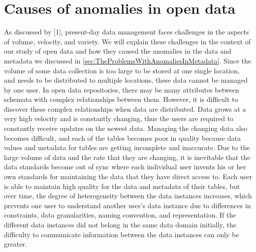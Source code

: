 \section{Causes of anomalies in open data}
\label{sec:CausesOfAnomaliesInOpenData}

As discussed by \cite{10.1145/2845915}[1], present-day data management faces challenges in the aspects of volume, velocity, and variety. We will explain these challenges in the context of our study of open data and how they caused the anomalies in the data and metadata we discussed in \autoref{sec:TheProblemsWithAnomaliesInMetadata}.
Since the volume of some data collection is too large to be stored at one single location, and needs to be distributed to multiple locations, these data cannot be managed by one user. In open data repositories, there may be many attributes between schemata with complex relationships between them. However, it is difficult to discover these complex relationships when data are distributed.
Data grows at a very high velocity and is constantly changing, thus the users are required to constantly receive updates on the newest data. Managing the changing data also becomes difficult, and each of the tables becomes poor in quality because data values and metadata for tables are getting incomplete and inaccurate.
Due to the large volume of data and the rate that they are changing, it is inevitable that the data standards become out of sync where each individual user invents his or her own standards for maintaining the data that they have direct access to. Each user is able to maintain high quality for the data and metadata of their tables, but over time, the degree of heterogeneity between the data instances increases, which prevents one user to understand another user’s data instance due to differences in constraints, data granularities, naming convention, and representation. If the different data instances did not belong in the same data domain initially, the difficulty to communicate information between the data instances can only be greater.


